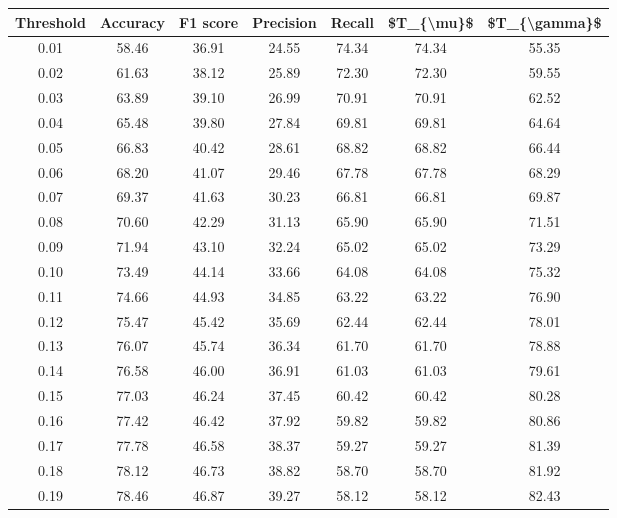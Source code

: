 \begin{tabular}{|c|c|c|c|c|c|c|}
\hline
 Threshold &  Accuracy &  F1 score &  Precision &  Recall &  \$T\_\{\textbackslash mu\}\$ &  \$T\_\{\textbackslash gamma\}\$ \\
\hline
      0.01 &     58.46 &     36.91 &      24.55 &   74.34 &      74.34 &         55.35 \\
      0.02 &     61.63 &     38.12 &      25.89 &   72.30 &      72.30 &         59.55 \\
      0.03 &     63.89 &     39.10 &      26.99 &   70.91 &      70.91 &         62.52 \\
      0.04 &     65.48 &     39.80 &      27.84 &   69.81 &      69.81 &         64.64 \\
      0.05 &     66.83 &     40.42 &      28.61 &   68.82 &      68.82 &         66.44 \\
      0.06 &     68.20 &     41.07 &      29.46 &   67.78 &      67.78 &         68.29 \\
      0.07 &     69.37 &     41.63 &      30.23 &   66.81 &      66.81 &         69.87 \\
      0.08 &     70.60 &     42.29 &      31.13 &   65.90 &      65.90 &         71.51 \\
      0.09 &     71.94 &     43.10 &      32.24 &   65.02 &      65.02 &         73.29 \\
      0.10 &     73.49 &     44.14 &      33.66 &   64.08 &      64.08 &         75.32 \\
      0.11 &     74.66 &     44.93 &      34.85 &   63.22 &      63.22 &         76.90 \\
      0.12 &     75.47 &     45.42 &      35.69 &   62.44 &      62.44 &         78.01 \\
      0.13 &     76.07 &     45.74 &      36.34 &   61.70 &      61.70 &         78.88 \\
      0.14 &     76.58 &     46.00 &      36.91 &   61.03 &      61.03 &         79.61 \\
      0.15 &     77.03 &     46.24 &      37.45 &   60.42 &      60.42 &         80.28 \\
      0.16 &     77.42 &     46.42 &      37.92 &   59.82 &      59.82 &         80.86 \\
      0.17 &     77.78 &     46.58 &      38.37 &   59.27 &      59.27 &         81.39 \\
      0.18 &     78.12 &     46.73 &      38.82 &   58.70 &      58.70 &         81.92 \\
      0.19 &     78.46 &     46.87 &      39.27 &   58.12 &      58.12 &         82.43 \\

\end{tabular}
